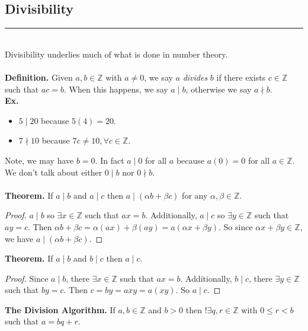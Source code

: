 \documentclass[class=article, crop=false]{standalone}
\def\integers{{\mathbb Z}}
\begin{document}
\subsection{Divisibility}
\rule{\textwidth}{1pt}\\
Divisibility underlies much of what is done in number theory.\\\\
\textbf{Definition.} Given $a,b\in\integers$ with $a\neq 0$, we say $a$ \emph{divides} $b$ if there exists $c\in\integers$
such that $ac=b$. When this happens, we say $a\mid b$, otherwise we say $a\nmid b$.\\
\textbf{Ex.}
\begin{itemize}
	\item $5\mid 20$ because $5(4) =20$.
	\item $7\nmid 10$ because $7c\neq 10, \forall c\in\integers$.
\end{itemize}
Note, we may have $b=0$. In fact $a\mid 0$ for all $a$ because $a(0)=0$ for all $a\in\integers$. We don't talk about
either $0\mid b$ nor $0\nmid b$.\\\\
\textbf{Theorem.} If $a\mid b$ and $a\mid c$ then $a\mid (\alpha b + \beta c)$ for any $\alpha, \beta\in\integers$.
\begin{proof}
	$a\mid b$ so $\exists x\in\integers$ such that $ax=b$. Additionally, $a\mid c$ so $\exists y\in\integers$ such that
	$ay=c$. Then $\alpha b + \beta c = \alpha(ax) + \beta(ay) = a(\alpha x + \beta y)$. So since $\alpha x + \beta y \in \integers$,
	we have $a\mid (\alpha b + \beta c)$.
\end{proof}
\noindent\textbf{Theorem.} If $a\mid b$ and $b\mid c$ then $a\mid c$.
\begin{proof}
	Since $a\mid b$, there $\exists x\in\integers$ such that $ax=b$. Additionally, $b\mid c$, there $\exists y\in\integers$
	such that $by=c$. Then $c=by=axy=a(xy)$. So $a\mid c$.
\end{proof}
\noindent\textbf{The Division Algorithm.} If $a,b\in\integers$ and $b>0$ then $!\exists q,r\in\integers$ with $0\leq r<b$
such that $a=bq+r$.
\end{document}
